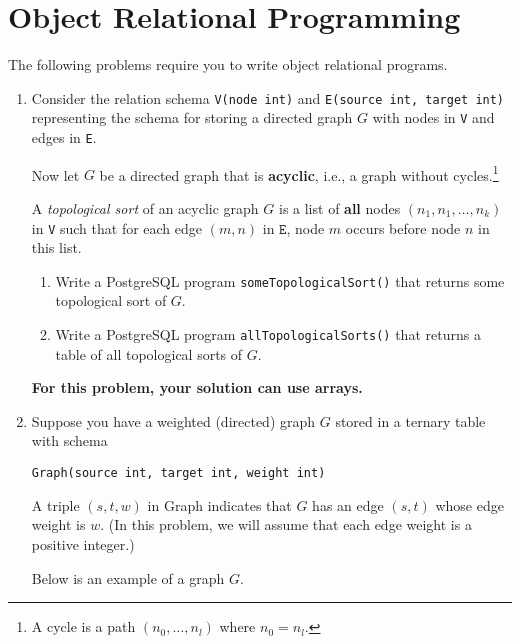\documentclass[10pt]{article}
\newcommand{\blue}[1]{{\color{blue}#1}}
\begin{document}
\newpage
\section{Object Relational Programming}

The following problems require you to write object relational programs.  


\begin{enumerate}[resume]
\item %
Consider the relation schema {\tt V(node int)} and {\tt E(source int, target int)}
representing the schema for storing a directed graph $G$ with nodes in  {\tt V} and
edges in {\tt E}.

Now let $G$ be a directed graph that is {\bf acyclic}, i.e., a graph without cycles.\footnote{A cycle is
a path $(n_0,\ldots, n_l)$ where $n_0=n_l$.}

A \emph{topological sort} of an acyclic graph $G$ is a list of {\bf all} nodes 
$(n_1,n_1,\ldots, n_k)$ in {\tt V} such that for each edge $(m,n)$ in $\mathtt{E}$,
node $m$ occurs before node $n$ in this list.   %

\begin{enumerate}
\item Write a PostgreSQL program {\tt someTopologicalSort()} that returns some
topological sort of $G$.
\item Write a PostgreSQL program {\tt allTopologicalSorts()} that returns a table of all topological sorts of $G$.
\end{enumerate}

\blue{\bf For this problem, your solution can use arrays.}

\item %

Suppose you have a weighted (directed) graph $G$ stored
  in a ternary table with schema
  \begin{center}
  {\tt Graph(source int, target int, weight int)}
  \end{center}
    A triple
  $(s,t,w)$ in Graph indicates that $G$ has an edge $(s,t)$ whose
  edge weight is $w$.
  (In this problem, we will assume that each edge weight is a positive
  integer.)

  Below  is an example of a graph $G$.



\end{enumerate}
\end{document}
